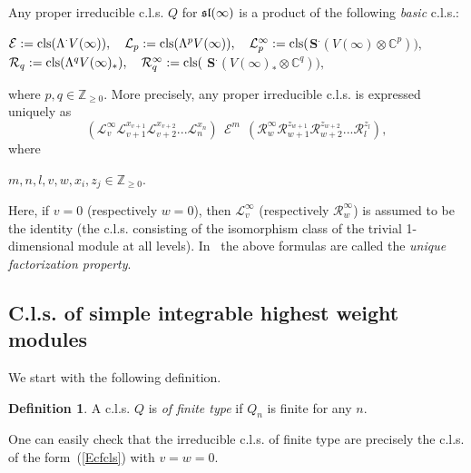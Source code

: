 \documentclass[10pt]{amsart}\oddsidemargin -1mm \evensidemargin -1mm \topmargin -15mm\headheight5mm \headsep 3.5mm \textheight 245mm\textwidth 170mm %
\theoremstyle{definition}\newtheorem{theorem}{Theorem}[section]\newtheorem{lemma}[theorem]{Lemma}\newtheorem{remark}[theorem]{Remark}\newtheorem{proposition}[theorem]{Proposition}\newtheorem{corollary}[theorem]{Corollary}\newtheorem{definition}[theorem]{Definition}\newtheorem{Ex}[theorem]{Example}
\begin{document}
Any proper irreducible c.l.s. $Q$ for $\frak{sl}(\infty)$ is a product of
the following {\it basic} c.l.s.:
\begin{center}$\mathcal E:=\operatorname{\mathrm{cls}}(\Lambda^\cdot V(\infty)),\hspace{10pt}\mathcal L_p:=\operatorname{\mathrm{cls}}(\Lambda^p V(\infty)),\hspace{10pt} \mathcal
L_p^\infty:=\operatorname{\mathrm{cls}}(${\bf S}$^\cdot(V(\infty)\otimes\mathbb C^p)),$\\$\mathcal R_q:=\operatorname{\mathrm{cls}}(\Lambda^qV(\infty)_*),\hspace{10pt} \mathcal R_q^\infty:=\operatorname{\mathrm{cls}}(${\bf
S}$^\cdot(V(\infty)_*\otimes\mathbb C^q)),$
\end{center} where $p,
q\in\mathbb Z_{\ge0}$. More precisely, any proper irreducible c.l.s. is expressed uniquely
as\begin{equation}(\mathcal L_v^\infty\mathcal L_{v+1}^{x_{v+1}}\mathcal
L_{v+2}^{x_{v+2}}...\mathcal L_n^{x_n})~~\mathcal E^m~~(\mathcal
R_w^\infty\mathcal R_{w+1}^{z_{w+1}}\mathcal
R_{w+2}^{z_{w+2}}...\mathcal R_l^{z_l}),\label{Ecfcls}\end{equation}where
\begin{center}$m, n, l, v, w, x_i, z_j\in\mathbb Z_{\ge0}$.\end{center}Here, if $v=0$ (respectively $w=0$), then
$\mathcal L_v^\infty$ (respectively $\mathcal R_w^\infty$) is
assumed to be the identity (the c.l.s. consisting of the isomorphism
class of the trivial 1-dimensional module at all levels).
In~\cite{Zh2} the above formulas are called the {\it unique
factorization property}.


\subsection{C.l.s. of simple integrable highest weight modules}We start with the following definition.
\begin{definition}A c.l.s. $Q$ is {\it of finite type} if $Q_n$ is finite for any $n$.\end{definition}
One can easily check that the irreducible c.l.s. of finite type are precisely the c.l.s. of the form~(\ref{Ecfcls}) with $v=w=0$.
\end{document}
